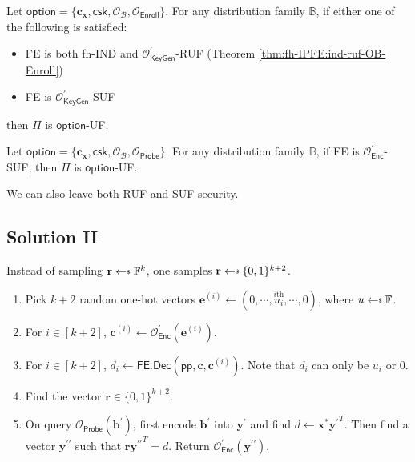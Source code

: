 \begin{theorem}
	Let $\textsf{option} = \{ \mathbf{c_x}, \textsf{csk}, \mathcal{O}_\mathcal{B}, \mathcal{O}_{\textsf{Enroll}} \}$. For any distribution family $\mathbb{B}$, if either one of the following is satisfied:
	\begin{itemize}
		\item \textsf{FE} is both fh-IND and $\mathcal{O}^\prime_{\textsf{KeyGen}}$-RUF (Theorem \ref{thm:fh-IPFE:ind-ruf-OB-Enroll})
		\item \textsf{FE} is $\mathcal{O}^\prime_{\textsf{KeyGen}}$-SUF
	\end{itemize}
then $\Pi$ is $\textsf{option}$-UF. 
\end{theorem}

\begin{theorem}
	Let $\textsf{option} = \{ \mathbf{c_x}, \textsf{csk}, \mathcal{O}_\mathcal{B}, \mathcal{O}_{\textsf{Probe}} \}$. For any distribution family $\mathbb{B}$, if \textsf{FE} is $\mathcal{O}^\prime_{\textsf{Enc}}$-SUF, then $\Pi$ is $\textsf{option}$-UF. 
\end{theorem}

We can also leave both \textsf{RUF} and \textsf{SUF} security.

\subsection{Solution II}

Instead of sampling $\mathbf{r} \getsdollar \mathbb{F}^{k}$, one samples $\mathbf{r} \getsdollar \{0, 1\}^{k+2}$.
\begin{enumerate}

	\item Pick $k+2$ random one-hot vectors $\mathbf{e}^{(i)} \gets (0, \cdots, \overset{i\text{th}}{u_i}, \cdots, 0)$, where $u \getsdollar \mathbb{F}$.

	\item For $i \in [k+2]$, $\mathbf{c}^{(i)} \gets \mathcal{O}^\prime_{\textsf{Enc}}(\mathbf{e}^{(i)})$.

	\item For $i \in [k+2]$, $d_i \gets \textsf{FE.Dec}(\textsf{pp}, \mathbf{c}, \mathbf{c}^{(i)})$. Note that $d_i$ can only be $u_i$ or $0$.

	\item Find the vector $\mathbf{r} \in \{0, 1\}^{k+2}$.

	\item On query $\mathcal{O}_{\textsf{Probe}}(\mathbf{b}^\prime)$, first encode $\mathbf{b}^\prime$ into $\mathbf{y}^\prime$ and find $d \gets \mathbf{x}^{*}{\mathbf{y}^\prime}^T$. Then find a vector $\mathbf{y}^{\prime\prime}$ such that $\mathbf{r} {\mathbf{y}^{\prime\prime}}^T = d$. Return $\mathcal{O}^\prime_{\textsf{Enc}}(\mathbf{y}^{\prime\prime})$.

\end{enumerate}

